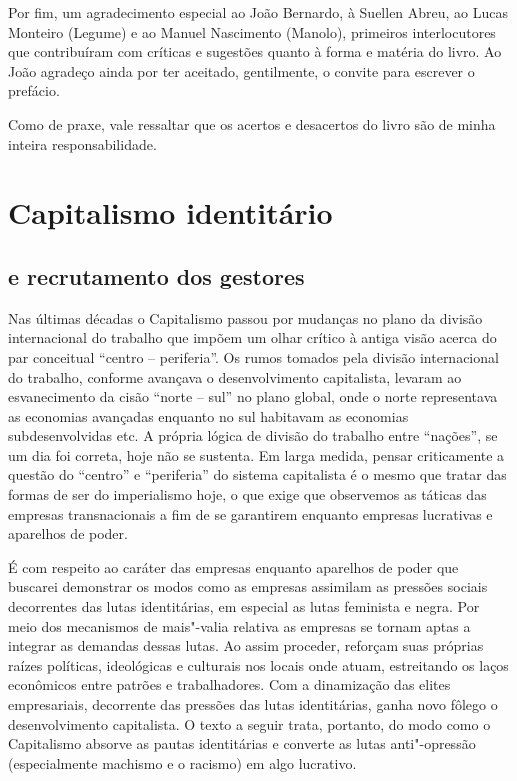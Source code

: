 Por fim, um agradecimento especial ao João Bernardo, à Suellen Abreu, ao
Lucas Monteiro (Legume) e ao Manuel Nascimento (Manolo), primeiros
interlocutores que contribuíram com críticas e sugestões quanto à forma
e matéria do livro. Ao João agradeço ainda por ter aceitado,
gentilmente, o convite para escrever o prefácio.

Como de praxe, vale ressaltar que os acertos e desacertos do livro são
de minha inteira responsabilidade.

\part{Capitalismo identitário}

\chapter{ e recrutamento dos gestores}

Nas últimas décadas o Capitalismo passou por mudanças no plano da
divisão internacional do trabalho que impõem um olhar crítico à antiga
visão acerca do par conceitual ``centro -- periferia''. Os rumos tomados
pela divisão internacional do trabalho, conforme avançava o
desenvolvimento capitalista, levaram ao esvanecimento da cisão ``norte
-- sul'' no plano global, onde o norte representava as economias
avançadas enquanto no sul habitavam as economias subdesenvolvidas etc. A
própria lógica de divisão do trabalho entre ``nações'', se um dia foi
correta, hoje não se sustenta. Em larga medida, pensar criticamente a
questão do ``centro'' e ``periferia'' do sistema capitalista é o mesmo
que tratar das formas de ser do imperialismo hoje, o que exige que
observemos as táticas das empresas transnacionais a fim de se garantirem
enquanto empresas lucrativas e aparelhos de poder.

É com respeito ao caráter das empresas enquanto aparelhos de poder que
buscarei demonstrar os modos como as empresas assimilam as pressões
sociais decorrentes das lutas identitárias, em especial as lutas
feminista e negra. Por meio dos mecanismos de mais"-valia relativa as
empresas se tornam aptas a integrar as demandas dessas lutas. Ao assim
proceder, reforçam suas próprias raízes políticas, ideológicas e
culturais nos locais onde atuam, estreitando os laços econômicos entre
patrões e trabalhadores. Com a dinamização das elites empresariais,
decorrente das pressões das lutas identitárias, ganha novo fôlego o
desenvolvimento capitalista. O texto a seguir trata, portanto, do modo
como o Capitalismo absorve as pautas identitárias e converte as lutas
anti"-opressão (especialmente machismo e o racismo) em algo lucrativo.

